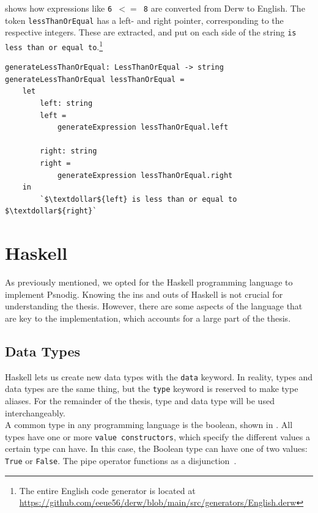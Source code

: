  shows how expressions like \texttt{6 $<=$ 8} are converted from Derw to English. The token \texttt{lessThanOrEqual} has a left- and right pointer, corresponding to the respective integers. These are extracted, and put on each side of the string \texttt{is less than or equal to}.\footnote{The entire English code generator is located at \url{https://github.com/eeue56/derw/blob/main/src/generators/English.derw}} \\

\begin{lstlisting}[caption={The function that converts a \texttt{Less than or equal}-expression in Derw to English.}, captionpos=b, label={LTE in Derw}]
generateLessThanOrEqual: LessThanOrEqual -> string
generateLessThanOrEqual lessThanOrEqual =
    let
        left: string
        left =
            generateExpression lessThanOrEqual.left

        right: string
        right =
            generateExpression lessThanOrEqual.right
    in
        `$\textdollar${left} is less than or equal to $\textdollar${right}`
\end{lstlisting}

\section{Haskell}

As previously mentioned, we opted for the Haskell programming language to implement Psnodig. Knowing the ins and outs of Haskell is not crucial for understanding the thesis. However, there are some aspects of the language that are key to the implementation, which accounts for a large part of the thesis.

\subsection{Data Types}

Haskell lets us create new data types with the \texttt{data} keyword. In reality, types and data types are the same thing, but the \texttt{type} keyword is reserved to make type aliases. For the remainder of the thesis, type and data type will be used interchangeably. \\

A common type in any programming language is the boolean, shown in . All types have one or more \texttt{value constructors}, which specify the different values a certain type can have. In this case, the Boolean type can have one of two values: \texttt{True} or \texttt{False}. The pipe operator functions as a disjunction~\cite[109]{LYAH}. \\

